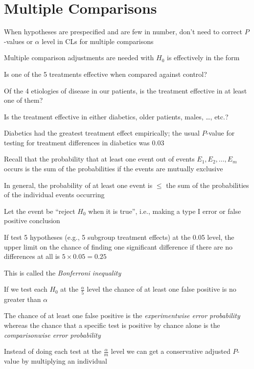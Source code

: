 \section{Multiple Comparisons} 
\bi
\item When hypotheses are prespecified and are few in number, don't
  need to correct $P$-values or $\alpha$ level in CLs for multiple
  comparisons
\item Multiple comparison adjustments are needed with $H_{0}$ is
  effectively in the form 
 \bi 
 \item Is one of the 5 treatments effective when compared against
   control?
 \item Of the 4 etiologies of disease in our patients, is the
   treatment effective in at least one of them?
 \item Is the treatment effective in either diabetics, older patients,
   males, \ldots, etc.?
 \item Diabetics had the greatest treatment effect empirically; the
   usual $P$-value for testing for treatment differences in diabetics
   was 0.03 
 \ei
\item Recall that the probability that at least one event out of
  events $E_{1}, E_{2}, \ldots, E_{m}$ occurs is the sum of the
  probabilities if the events are mutually exclusive
\item In general, the probability of at least one event is $\leq$ the
  sum of the probabilities of the individual events occurring
\item Let the event be ``reject $H_0$ when it is true'', i.e., making
  a type I error or false positive conclusion
\item If test 5 hypotheses (e.g., 5 subgroup treatment effects) at the
  0.05 level, the upper limit on the chance of finding one significant
  difference if there are no differences at all is $5 \times 0.05 =
  0.25$
\item This is called the \emph{Bonferroni inequality}
\item If we test each $H_0$ at the $\frac{\alpha}{5}$ level the chance
  of at least one false positive is no greater than $\alpha$
\item The chance of at least one false positive is the
  \emph{experimentwise error probability} whereas the chance that a
  specific test is positive by chance alone is the
  \emph{comparisonwise error probability}
\item Instead of doing each test at the $\frac{\alpha}{m}$ level we can
  get a conservative adjusted $P$-value by multiplying an individual
